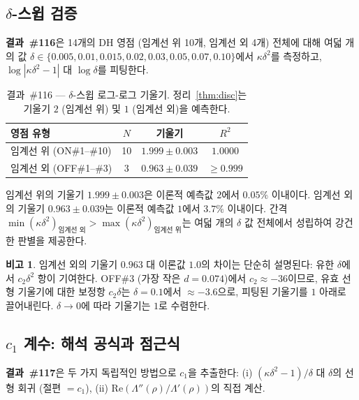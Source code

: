 \documentclass[11pt, a4paper]{article}
\theoremstyle{plain}
\theoremstyle{definition}
\newtheorem{remark}{비고}[section]
\begin{document}
\subsection{$\delta$-스윕 검증}
\label{ssec:sweep}

\textbf{결과~\#116}은 14개의 DH 영점
(임계선 위 10개, 임계선 외 4개) 전체에 대해
여덟 개의 값 $\delta\in\{0.005,0.01,0.015,0.02,0.03,0.05,0.07,0.10\}$에서
$\kappa\delta^{2}$를 측정하고,
$\log|\kappa\delta^{2}-1|$ 대 $\log\delta$를 피팅한다.

\begin{table}[ht]
\centering
\caption{결과~\#116 — $\delta$-스윕 로그-로그 기울기.
  정리~\ref{thm:disc}는 기울기 $2$ (임계선 위) 및 $1$ (임계선 외)을 예측한다.}
\label{tab:sweep116}
\small
\begin{tabular}{lccc}
\toprule
영점 유형 & $N$ & 기울기 & $R^{2}$ \\
\midrule
임계선 위 (ON\#1--\#10)  & 10 & $1.999\pm 0.003$ & $1.0000$ \\
임계선 외 (OFF\#1--\#3) & 3  & $0.963\pm 0.039$ & $\geq 0.999$ \\
\bottomrule
\end{tabular}
\end{table}

임계선 위의 기울기 $1.999\pm0.003$은
이론적 예측값 $2$에서 $0.05\%$ 이내이다.
임계선 외의 기울기 $0.963\pm0.039$는
이론적 예측값 $1$에서 $3.7\%$ 이내이다.
간격 $\min(\kappa\delta^{2})_{\text{임계선 외}} > \max(\kappa\delta^{2})_{\text{임계선 위}}$는
여덟 개의 $\delta$ 값 전체에서 성립하여 강건한 판별을 제공한다.

\begin{remark}
  임계선 외의 기울기 $0.963$ 대 이론값 $1.0$의 차이는
  단순히 설명된다: 유한 $\delta$에서 $c_{2}\delta^{2}$ 항이 기여한다.
  OFF\#3 (가장 작은 $d=0.074$)에서 $c_{2}\approx -36$이므로,
  유효 선형 기울기에 대한 보정항 $c_{2}\delta$는
  $\delta=0.1$에서 $\approx -3.6$으로, 피팅된 기울기를 $1$ 아래로 끌어내린다.
  $\delta\to 0$에 따라 기울기는 $1$로 수렴한다.
\end{remark}


\subsection{$c_{1}$ 계수: 해석 공식과 점근식}
\label{ssec:c1}

\textbf{결과~\#117}은 두 가지 독립적인 방법으로 $c_{1}$을 추출한다:
(i) $(\kappa\delta^{2}-1)/\delta$ 대 $\delta$의 선형 회귀
(절편 $= c_{1}$),
(ii) $\mathrm{Re}(\Lambda''(\rho)/\Lambda'(\rho))$의 직접 계산.
\end{document}
